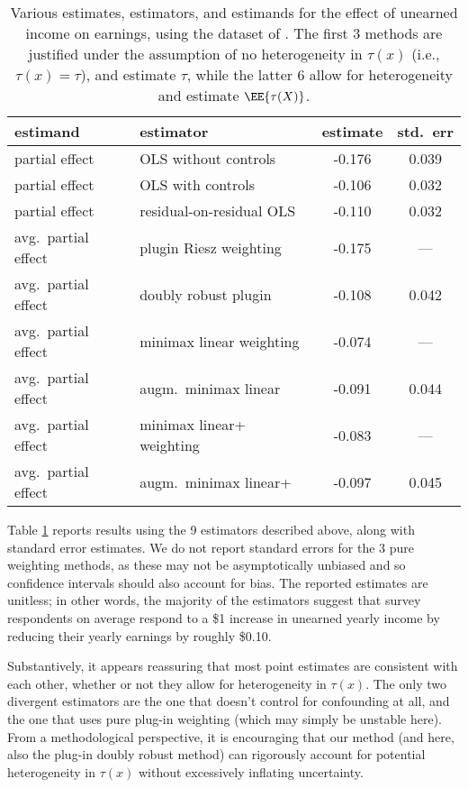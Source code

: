 \documentclass[aos,submission]{imsart}
\theoremstyle{plain}
\theoremstyle{remark}
\begin{document}
\begin{table}[t]
\begin{center}
\begin{tabular}{|ll|cc|}
  \hline
  estimand & estimator & estimate & std.~err \\ 
  \hline
  partial effect & OLS without controls & -0.176 & 0.039 \\ 
  partial effect & OLS with controls & -0.106 & 0.032 \\ 
  partial effect & residual-on-residual OLS & -0.110 & 0.032 \\ 
  avg.~partial effect & plugin Riesz weighting & -0.175 & --- \\ 
  avg.~partial effect & doubly robust plugin & -0.108 & 0.042 \\ 
  avg.~partial effect & minimax linear weighting & -0.074 & --- \\ 
  avg.~partial effect & augm.~minimax linear & -0.091 & 0.044 \\ 
  avg.~partial effect & minimax linear+ weighting & -0.083 & --- \\ 
  avg.~partial effect & augm.~minimax linear+ & -0.097 & 0.045 \\ 
   \hline
\end{tabular}
\caption[Estimates for the effect of unearned income on earnings using data from \citet*{imbens2001estimating}.]{Various estimates, estimators, and estimands for the effect of unearned income on earnings,
using the dataset of \citet*{imbens2001estimating}.
The first 3 methods are justified under the assumption of no heterogeneity in $\tau(x)$ (i.e., $\tau(x) = \tau$),
and estimate $\tau$, while the latter 6 allow for heterogeneity and estimate $\EE{\tau(X)}$.}
\label{tab:IRS}
\end{center}
\end{table}

Table \ref{tab:IRS} reports results using the 9 estimators described above, along with standard
error estimates. We do not report standard errors for the 3 pure weighting methods, as these may not be
asymptotically unbiased and so confidence intervals should also account for bias.
The reported estimates are unitless; in other words, the majority of the estimators suggest that
survey respondents on average respond to a \$1 increase in unearned yearly income by reducing
their yearly earnings by roughly \$0.10.

Substantively, it appears reassuring that most point estimates are consistent
with each other, whether or not they allow for heterogeneity in $\tau(x)$. The only two divergent estimators
are the one that doesn't control for confounding at all,
and the one that uses pure plug-in weighting (which may simply be unstable here).
From a methodological perspective, it is encouraging that our method (and here, also the plug-in doubly robust method)
can rigorously account for potential heterogeneity in $\tau(x)$ without excessively inflating uncertainty.
\end{document}
